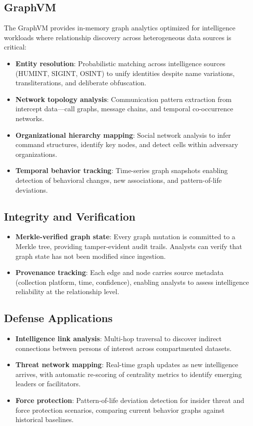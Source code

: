 \documentclass[11pt,letterpaper]{article}
\begin{document}
\subsection{GraphVM}

The GraphVM provides in-memory graph analytics optimized for intelligence workloads where relationship discovery across heterogeneous data sources is critical:

\begin{itemize}
\item \textbf{Entity resolution}: Probabilistic matching across intelligence sources (HUMINT, SIGINT, OSINT) to unify identities despite name variations, transliterations, and deliberate obfuscation.
\item \textbf{Network topology analysis}: Communication pattern extraction from intercept data---call graphs, message chains, and temporal co-occurrence networks.
\item \textbf{Organizational hierarchy mapping}: Social network analysis to infer command structures, identify key nodes, and detect cells within adversary organizations.
\item \textbf{Temporal behavior tracking}: Time-series graph snapshots enabling detection of behavioral changes, new associations, and pattern-of-life deviations.
\end{itemize}

\subsection{Integrity and Verification}

\begin{itemize}
\item \textbf{Merkle-verified graph state}: Every graph mutation is committed to a Merkle tree, providing tamper-evident audit trails. Analysts can verify that graph state has not been modified since ingestion.
\item \textbf{Provenance tracking}: Each edge and node carries source metadata (collection platform, time, confidence), enabling analysts to assess intelligence reliability at the relationship level.
\end{itemize}

\subsection{Defense Applications}

\begin{itemize}
\item \textbf{Intelligence link analysis}: Multi-hop traversal to discover indirect connections between persons of interest across compartmented datasets.
\item \textbf{Threat network mapping}: Real-time graph updates as new intelligence arrives, with automatic re-scoring of centrality metrics to identify emerging leaders or facilitators.
\item \textbf{Force protection}: Pattern-of-life deviation detection for insider threat and force protection scenarios, comparing current behavior graphs against historical baselines.
\end{itemize}
\end{document}

